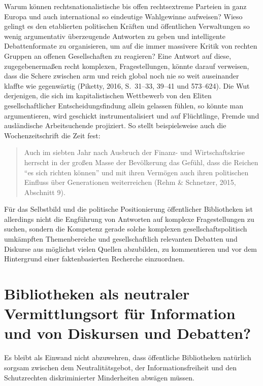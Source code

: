 \documentclass[a4paper,
fontsize=11pt,
oneside,
numbers=noperiodatend,
parskip=half-,
bibliography=totoc,
final
]{scrartcl}
\begin{document}
Warum können rechtsnationalistische bis offen rechtsextreme Parteien in
ganz Europa und auch international so eindeutige Wahlgewinne aufweisen?
Wieso gelingt es den etablierten politischen Kräften und öffentlichen
Verwaltungen so wenig argumentativ überzeugende Antworten zu geben und
intelligente Debattenformate zu organisieren, um auf die immer massivere
Kritik von rechten Gruppen an offenen Gesellschaften zu reagieren? Eine
Antwort auf diese, zugegebenermaßen recht komplexen, Fragestellungen,
könnte darauf verweisen, dass die Schere zwischen arm und reich global
noch nie so weit auseinander klaffte wie gegenwärtig (Piketty, 2016,
S.~31--33, 39--41 und 573--624). Die Wut derjenigen, die sich im
kapitalistischen Wettbewerb von den Eliten gesellschaftlicher
Entscheidungsfindung allein gelassen fühlen, so könnte man
argumentieren, wird geschickt instrumentalisiert und auf Flüchtlinge,
Fremde und ausländische Arbeitsuchende projiziert. So stellt
beispielsweise auch die Wochenzeitschrift die Zeit fest:

\begin{quote}
Auch im siebten Jahr nach Ausbruch der Finanz- und Wirtschaftskrise
herrscht in der großen Masse der Bevölkerung das Gefühl, dass die
Reichen \enquote{es sich richten können} und mit ihren Vermögen auch
ihren politischen Einfluss über Generationen weiterreichen (Rehm \&
Schnetzer, 2015, Abschnitt 9).
\end{quote}

Für das Selbstbild und die politische Positionierung öffentlicher
Bibliotheken ist allerdings nicht die Engführung von Antworten auf
komplexe Fragestellungen zu suchen, sondern die Kompetenz gerade solche
komplexen gesellschaftspolitisch umkämpften Themenbereiche und
gesellschaftlich relevanten Debatten und Diskurse aus möglichst vielen
Quellen abzubilden, zu kommentieren und vor dem Hintergrund einer
faktenbasierten Recherche einzuordnen.

\hypertarget{bibliotheken-als-neutraler-vermittlungsort-fuxfcr-information-und-von-diskursen-und-debatten}{%
\section*{Bibliotheken als neutraler Vermittlungsort für
Information und von Diskursen und
Debatten?}\label{bibliotheken-als-neutraler-vermittlungsort-fuxfcr-information-und-von-diskursen-und-debatten}}

Es bleibt als Einwand nicht abzuwehren, dass öffentliche Bibliotheken
natürlich sorgsam zwischen dem Neutralitätsgebot, der
Informationsfreiheit und den Schutzrechten diskriminierter Minderheiten
abwägen müssen.
\end{document}
